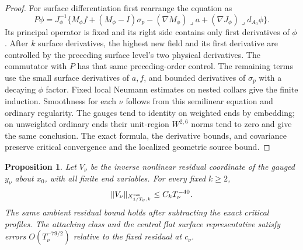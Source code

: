 \documentclass[11pt]{amsart}
\newtheorem{proposition}[theorem]{Proposition}
\theoremstyle{definition}
\theoremstyle{remark}
\theoremstyle{plain}
\begin{document}
\begin{proof}
For surface differentiation first rearrange the equation as
\[
 P\phi=J_\phi^{-1}\{M_\phi f+(M_\phi-I)\sigma_p
       -(\nabla M_\phi)\mathbin{\lrcorner}a
       +(\nabla J_\phi)\mathbin{\lrcorner}d_{A_0}\phi\}.
\]
Its principal operator is fixed and its right side contains
only first derivatives of $\phi$. After $k$ surface derivatives,
the highest new field and its first derivative are controlled
by the preceding surface level's two physical derivatives.
The commutator with $P$ has that same preceding-order control.
The remaining terms use the small surface derivatives of
$a,f$, and bounded derivatives of $\sigma_p$ with a decaying
$\phi$ factor. Fixed local Neumann estimates on nested collars
give the finite induction. Smoothness for each $\nu$ follows
from this semilinear equation and ordinary regularity.
The gauges tend to identity on weighted ends by embedding;
on unweighted ordinary ends their unit-region $W^{2,6}$
norms tend to zero and give the same conclusion.
The exact formula, the derivative bounds, and covariance
preserve critical convergence and the localized geometric
source bound.
\end{proof}

\begin{proposition}\label{prop:converse-residual-rate}
Let $V_\nu$ be the inverse nonlinear residual coordinate of
the gauged $y_\nu$ about $x_0$, with all finite end variables.
For every fixed $k\geq2$,
\begin{equation}\label{eq:converse-residual-rate}
              \|V_\nu\|_{X^{\rm res}_{1/T_\nu,k}}
                                      \leq C_kT_\nu^{-40}.
\end{equation}
The same ambient residual bound holds after subtracting the
exact critical profiles. The attaching class and the central
flat surface representative satisfy errors $O(T_\nu^{-79/2})$
relative to the fixed residual at $c_\nu$.
\end{proposition}
\end{document}

